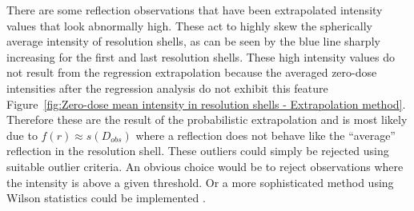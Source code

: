 There are some reflection observations that have been extrapolated intensity values that look abnormally high.
These act to highly skew the spherically average intensity of resolution shells, as can be seen by the blue line sharply increasing for the first and last resolution shells.
These high intensity values do not result from the regression extrapolation because the averaged zero-dose intensities after the regression analysis do not exhibit this feature Figure~\ref{fig:Zero-dose mean intensity in resolution shells - Extrapolation method}.
Therefore these are the result of the probabilistic extrapolation and is most likely due to $f(r) \approx s(D_{obs})$ where a reflection does not behave like the ``average'' reflection in the resolution shell.
These outliers could simply be rejected using suitable outlier criteria.
An obvious choice would be to reject observations where the intensity is above a given threshold.
Or a more sophisticated method using Wilson statistics could be implemented \cite{read1999detecting}.
